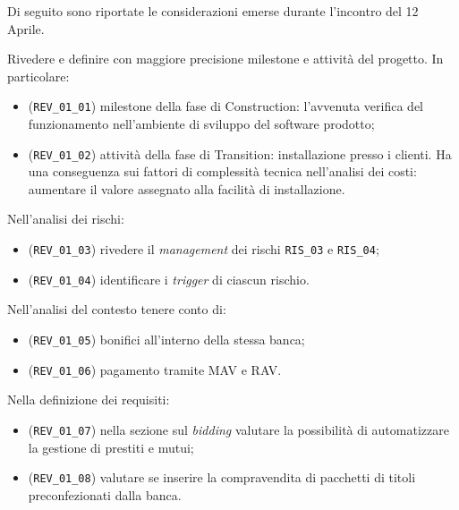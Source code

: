 \documentclass[a4paper,11pt]{texmemo}
\newcommand{\code}[1]{\texttt{#1}}
\begin{document}
\maketitle

Di seguito sono riportate le considerazioni emerse durante l'incontro del 12 Aprile.

Rivedere e definire con maggiore precisione milestone e attivit\`a del progetto.
In particolare:
\begin{itemize}
	\item (\code{REV\_01\_01}) milestone della fase di Construction: l'avvenuta verifica del funzionamento nell'ambiente di sviluppo del software prodotto;
	\item (\code{REV\_01\_02}) attivit\`a della fase di Transition: installazione presso i clienti.
		Ha una conseguenza sui fattori di complessit\`a tecnica nell'analisi dei costi: aumentare il valore assegnato alla facilit\`a di installazione.
\end{itemize}

Nell'analisi dei rischi:
\begin{itemize}
	\item (\code{REV\_01\_03}) rivedere il \emph{management} dei rischi \code{RIS\_03} e \code{RIS\_04};
	\item (\code{REV\_01\_04}) identificare i \emph{trigger} di ciascun rischio.
\end{itemize}

Nell'analisi del contesto tenere conto di:
\begin{itemize}
	\item (\code{REV\_01\_05}) bonifici all'interno della stessa banca;
	\item (\code{REV\_01\_06}) pagamento tramite MAV\cite{mav_wiki} e RAV.
\end{itemize}

Nella definizione dei requisiti:
\begin{itemize}
	\item (\code{REV\_01\_07}) nella sezione sul \emph{bidding} valutare la possibilit\`a di automatizzare la gestione di prestiti e mutui;
	\item (\code{REV\_01\_08}) valutare se inserire la compravendita di pacchetti di titoli preconfezionati dalla banca.
\end{itemize}

\renewcommand{\refname}{Riferimenti}
\printbibliography
\end{document}
